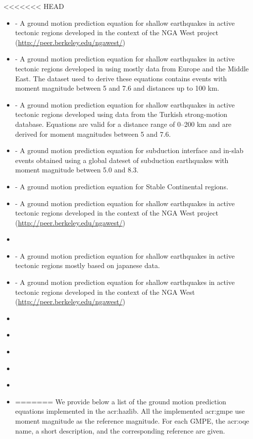 <<<<<<< HEAD
\begin{itemize} 
    \item \cite{abrahamson2008} - A ground motion prediction equation 
    for shallow earthquakes in active tectonic regions developed in 
    the context of the NGA West project
    (\href{http://peer.berkeley.edu/ngawest/}{http://peer.berkeley.edu/ngawest/})
    \item \cite{akkar2010} - A ground motion prediction equation 
    for shallow earthquakes in active tectonic regions developed in 
    using mostly data from Europe and the Middle East. The dataset 
    used to derive these equations contains events with moment 
    magnitude between 5 and 7.6 and distances up to 100 km.
    \item \cite{akkar2010a} - A ground motion prediction equation for shallow
    earthquakes in active tectonic regions developed using data from the 
    Turkish strong-motion database. Equations are valid for a distance 
    range of 0–200 km and are derived for moment magnitudes 
    between 5 and 7.6.
    \item \cite{atkinson2003} - A ground motion prediction equation for 
    subduction interface and in-slab events obtained using a global 
    dateset of subduction earthquakes with moment magnitude between 
    5.0 and 8.3.
    \item \cite{atkinson2006} - A ground motion prediction equation for 
    Stable Continental regions.
    \item \cite{boore2008} - A ground motion prediction equation 
    for shallow earthquakes in active tectonic regions developed in 
    the context of the NGA West project 
    (\href{http://peer.berkeley.edu/ngawest/}{http://peer.berkeley.edu/ngawest/})
    \item \cite{campbell2003}
    \item \cite{cauzzi2008} - A ground motion prediction equation 
    for shallow earthquakes in active tectonic regions mostly based 
    on japanese data.
    \item \cite{chiou2008} - A ground motion prediction equation 
    for shallow earthquakes in active tectonic regions developed in 
    the context of the NGA West
    (\href{http://peer.berkeley.edu/ngawest/}{http://peer.berkeley.edu/ngawest/})
    \item \cite{faccioli2010}
    \item \cite{lin2008}
    \item \cite{sadigh1997}
    \item \cite{toro2002}
    \item \cite{youngs1997}
    \item \cite{zhao2006} 
=======
\label{sec:gmpes_list}
We provide below a list of the ground motion prediction equations 
implemented in the \gls{acr:hazlib}. All the implemented \gls{acr:gmpe}
use moment magnitude as the reference magnitude. For each GMPE,
the \gls{acr:oqe} name, a short description, and the corresponding reference
are given.
%

\end{itemize}

